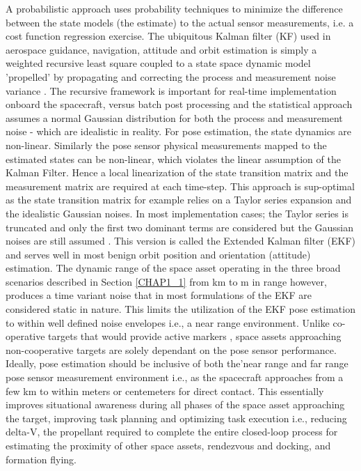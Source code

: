 A probabilistic approach uses probability techniques to minimize the difference between the state models (the estimate) to the actual sensor measurements, i.e. a cost function regression exercise. The ubiquitous Kalman filter (KF) used in  aerospace guidance, navigation, attitude and orbit estimation is simply a weighted recursive least square coupled to a state space dynamic model 'propelled' by propagating and correcting the process and measurement noise variance \cite{franklinDigitalControl97}. The recursive framework is important for real-time implementation onboard the spacecraft, versus batch post processing and the statistical approach assumes a normal Gaussian distribution for both the process and measurement noise - which are idealistic in reality. For pose estimation, the state dynamics are non-linear. Similarly the pose sensor physical measurements mapped to the estimated states can be non-linear, which violates the linear assumption of the Kalman Filter. Hence a local linearization of the state transition matrix and the measurement matrix are required at each time-step. This approach is sup-optimal as the state transition matrix for example relies on a Taylor series expansion and the idealistic Gaussian noises. In most implementation cases; the Taylor series is truncated and only the first two dominant terms are considered but the Gaussian noises are still assumed \cite{franklinDigitalControl97,cavenagoEkfHighOrder19}. This version is called the Extended Kalman filter (EKF) and serves well in most benign orbit position and orientation (attitude) estimation. The dynamic range of the space asset operating in the three broad scenarios described in Section \ref{CHAP1_1} from km to m in range however, produces a time variant noise that in most formulations of the EKF are considered static in nature. This limits the utilization of the EKF pose estimation to within well defined noise envelopes i.e., a near range environment. Unlike co-operative targets that would provide active markers \cite{OpromollaPose17}, space assets approaching non-cooperative targets are solely dependant on the pose sensor performance. Ideally, pose estimation should be inclusive of both the'near range and far range pose sensor measurement environment i.e., as the spacecraft approaches from a few km to within meters or centemeters for direct contact. This essentially improves situational awareness during all phases of the space asset approaching the target, improving task planning and optimizing task execution i.e., reducing delta-V, the propellant required to complete the entire closed-loop process for estimating the proximity of other space assets, rendezvous and docking, and formation flying.
	
